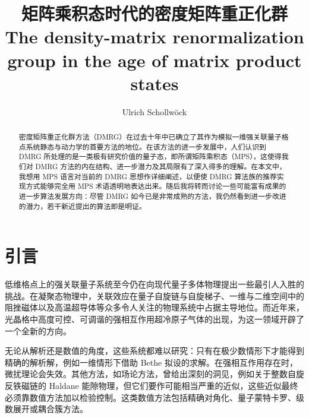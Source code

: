 \documentclass[a4paper,10pt,oneside,onecolumn,1p,times]{elsarticle}
\begin{document}
\title{矩阵乘积态时代的密度矩阵重正化群\\ The density-matrix renormalization group in the age of matrix product states}
\author{Ulrich Schollw\"{o}ck}
\address{Department of Physics, Arnold Sommerfeld Center for Theoretical Physics and Center for NanoScience, University of Munich, Theresienstrasse 37, 80333 Munich, Germany \\
Institute for Advanced Study Berlin, Wallotstrasse 19, 14159 Berlin, Germany}

\begin{abstract}
密度矩阵重正化群方法（DMRG）在过去十年中已确立了其作为模拟一维强关联量子格点系统静态与动力学的首要方法的地位。在该方法的进一步发展中，人们认识到 DMRG 所处理的是一类极有研究价值的量子态，即所谓矩阵乘积态（MPS），这使得我们对 DMRG 方法的内在结构、进一步潜力及其局限有了深入得多的理解。在本文中，我想用 MPS 语言对当前的 DMRG 思想作详细阐述，以便使 DMRG 算法族的推荐实现方式能够完全用 MPS 术语透明地表达出来。随后我将转而讨论一些可能富有成果的进一步算法发展方向：尽管 DMRG 如今已是非常成熟的方法，我仍然看到进一步改进的潜力，若干新近提出的算法即是明证。   
\end{abstract}

\maketitle 

\tableofcontents

\section{引言}
低维格点上的强关联量子系统至今仍在向现代量子多体物理提出一些最引人入胜的挑战。在凝聚态物理中，关联效应在量子自旋链与自旋梯子、一维与二维空间中的阻挫磁体以及高温超导体等众多令人关注的物理系统中占据主导地位。而近年来，光晶格中高度可控、可调谐的强相互作用超冷原子气体的出现，为这一领域开辟了一个全新的方向\cite{Bloch08}。 

无论从解析还是数值的角度，这些系统都难以研究：只有在极少数情形下才能得到精确的解析解，例如一维情形下借助 Bethe 拟设的求解\cite{Bethe31,Lieb68}。在强相互作用存在时，微扰理论会失效。其他方法，如场论方法，曾给出深刻的洞见，例如关于整数自旋反铁磁链的 Haldane 能隙物理\cite{Haldane83}，但它们要作可能相当严重的近似，这些近似最终必须靠数值方法加以检验控制。这类数值方法包括精确对角化、量子蒙特卡罗、级数展开或耦合簇方法。
\end{document}
